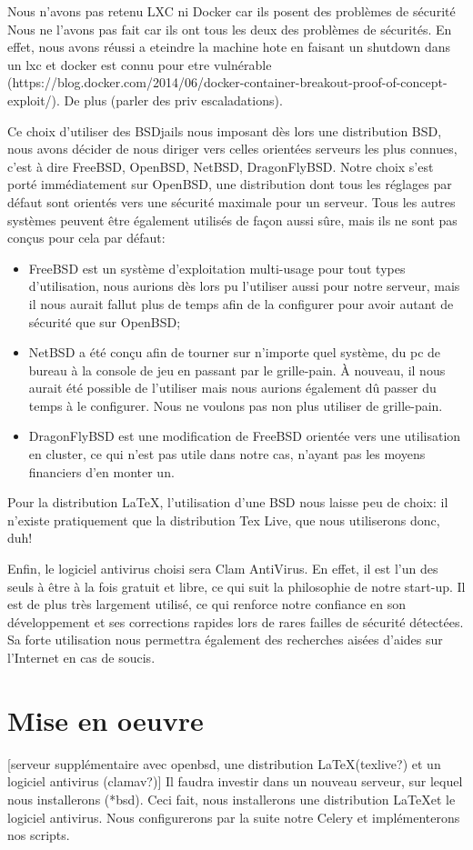 \documentclass[10pt,a4paper]{article}
\begin{document}
Nous n'avons pas retenu LXC ni Docker car ils posent des problèmes de sécurité
Nous ne l'avons pas fait car ils ont tous les deux des problèmes de sécurités.
En effet, nous avons réussi a eteindre la machine hote en faisant un shutdown dans un lxc et docker est connu pour etre vulnérable (https://blog.docker.com/2014/06/docker-container-breakout-proof-of-concept-exploit/).
De plus (parler des priv escaladations).


Ce choix d'utiliser des BSDjails nous imposant dès lors une distribution BSD, nous avons décider de nous diriger vers celles orientées serveurs les plus connues,
c'est à dire FreeBSD, OpenBSD, NetBSD, DragonFlyBSD.
Notre choix s'est porté immédiatement sur OpenBSD, une distribution dont tous les réglages par défaut sont orientés vers une sécurité maximale pour un serveur.
Tous les autres systèmes peuvent être également utilisés de façon aussi sûre, mais ils ne sont pas conçus pour cela par défaut:
\begin{itemize}
    \item FreeBSD est un système d'exploitation multi-usage pour tout types d'utilisation, nous aurions dès lors pu l'utiliser aussi pour notre serveur, mais il nous aurait fallut plus de temps afin de la configurer pour avoir autant de sécurité que sur OpenBSD;
    \item NetBSD a été conçu afin de tourner sur n'importe quel système, du pc de bureau à la console de jeu en passant par le grille-pain. À nouveau, il nous aurait été possible de l'utiliser mais nous aurions également dû passer du temps à le configurer. Nous ne voulons pas non plus utiliser de grille-pain.
    \item DragonFlyBSD est une modification de FreeBSD orientée vers une utilisation en cluster, ce qui n'est pas utile dans notre cas, n'ayant pas les moyens financiers d'en monter un.
\end{itemize}

Pour la distribution \LaTeX, l'utilisation d'une BSD nous laisse peu de choix: il n'existe pratiquement que la distribution Tex Live, que nous utiliserons donc, duh! %

Enfin, le logiciel antivirus choisi sera Clam AntiVirus.
En effet, il est l'un des seuls à être à la fois gratuit et libre, ce qui suit la philosophie de notre start-up.
Il est de plus très largement utilisé, ce qui renforce notre confiance en son développement et ses corrections rapides lors de rares failles de sécurité détectées.
Sa forte utilisation nous permettra également des recherches aisées d'aides sur l'Internet en cas de soucis.

\section{Mise en oeuvre}
[serveur supplémentaire avec openbsd, une distribution \LaTeX (texlive?) et un logiciel antivirus (clamav?)]
Il faudra investir dans un nouveau serveur, sur lequel nous installerons (*bsd).
Ceci fait, nous installerons une distribution \LaTeX et le logiciel antivirus.
Nous configurerons par la suite notre Celery et implémenterons nos scripts.
\end{document}
